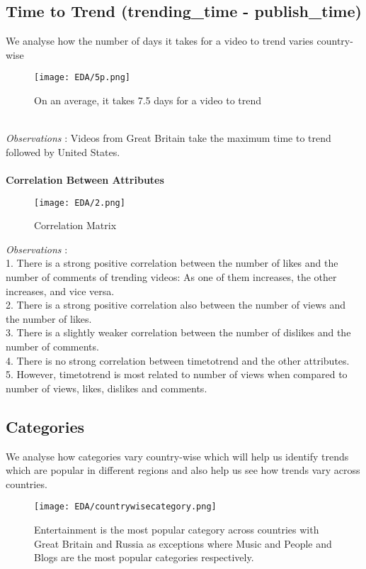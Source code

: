 \documentclass[runningheads]{llncs}
\begin{document}
\subsection{Time to Trend (trending\_time - publish\_time)}
We analyse how the number of days it takes for a video to trend varies country-wise
\begin{figure}
  \centering
  \texttt{[image: EDA/5p.png]}
  \caption{On an average, it takes 7.5 days for a video to trend}
\end{figure}
\\
\textit{Observations} : 
Videos from Great Britain take the maximum time to trend followed by United States.\\ \\
\textbf{Correlation Between Attributes}
\begin{figure}[H]
\centering
\begin{minipage}{.5\textwidth}
  \centering
  \texttt{[image: EDA/2.png]}
  \caption{Correlation Matrix}
\end{minipage}
\end{figure}
\textit{Observations} : 
\\1. There is a strong positive correlation between the number of likes and the number of comments of trending videos: As one of them increases, the other increases, and vice versa. \\
2. There is a strong positive correlation also between the number of views and the number of likes. \\
3. There is a slightly weaker correlation between the number of dislikes and the number of comments.\\ 
4. There is  no strong correlation between timetotrend and the other attributes.\\
5. However, timetotrend is most related to number of views when compared to number of views, likes, dislikes and comments.

\subsection{Categories}
We analyse how categories vary country-wise which will help us identify trends which are popular in different regions and also help us see how trends vary across countries.
\begin{figure}[H] 
\centering
\texttt{[image: EDA/countrywisecategory.png]}
\caption{Entertainment is the most popular category across countries with Great Britain and Russia as exceptions where Music and People and Blogs are the most popular categories respectively.}
\end{figure}
\end{document}
